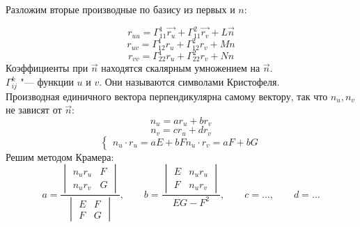 Разложим вторые производные по базису из первых и $ n $:

$$ \boxed{r_{uu} = \Gamma_{11}^1 \vec{r_u} + \Gamma_{11}^2 \vec{r_v} + L \vec n} $$
$$ \boxed{r_{uv} = \Gamma_{12}^1 r_u + \Gamma_{12}^2 r_v + Mn} $$
$$ \boxed{r_{vv} = \Gamma_{22}^1 r_u + \Gamma_{22}^2 r_v + Nn} $$
Коэффициенты при $ \vec n $ находятся скалярным умножением на $ \vec n $. \\
$ \Gamma_{ij}^k $ "--- функции $ u $ и $ v $. Они называются символами Кристофеля. \\
Производная единичного вектора перпендикулярна самому вектору, так что $ n_u, n_v $ не зависят от $ \vec n $:
$$ \boxed{n_u = ar_u + br_v} $$
$$ \boxed{n_v = cr_u + dr_v} $$
$$
\begin{cases}
	n_u \cdot r_u = aE + bF
	n_u \cdot r_v = aF + bG
\end{cases} $$
Решим методом Крамера:
$$ a = \frac{
	\begin{vmatrix}
		n_ur_u & F \\
		n_ur_v & G
	\end{vmatrix}}{
	\begin{vmatrix}
		E & F \\
		F & G
	\end{vmatrix}}, \qquad b = \frac{
	\begin{vmatrix}
		E & n_ur_u \\
		F & n_ur_v
	\end{vmatrix}}{EG - F^2}, \qquad c = \dots, \qquad d = \dots $$
